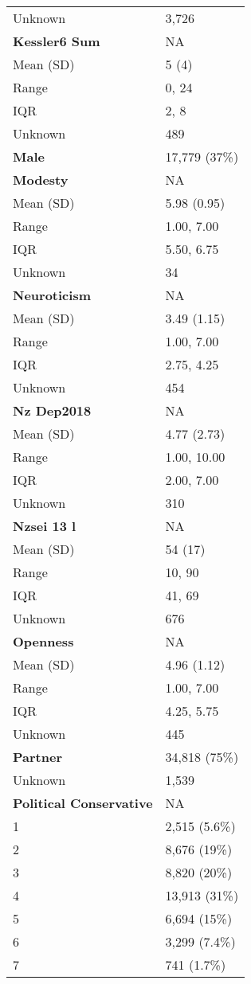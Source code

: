 \documentclass[
  singlecolumn]{article}
\begin{document}
\begin{longtable}[]{@{}ll@{}}
Unknown & 3,726 \\
\textbf{Kessler6 Sum} & NA \\
Mean (SD) & 5 (4) \\
Range & 0, 24 \\
IQR & 2, 8 \\
Unknown & 489 \\
\textbf{Male} & 17,779 (37\%) \\
\textbf{Modesty} & NA \\
Mean (SD) & 5.98 (0.95) \\
Range & 1.00, 7.00 \\
IQR & 5.50, 6.75 \\
Unknown & 34 \\
\textbf{Neuroticism} & NA \\
Mean (SD) & 3.49 (1.15) \\
Range & 1.00, 7.00 \\
IQR & 2.75, 4.25 \\
Unknown & 454 \\
\textbf{Nz Dep2018} & NA \\
Mean (SD) & 4.77 (2.73) \\
Range & 1.00, 10.00 \\
IQR & 2.00, 7.00 \\
Unknown & 310 \\
\textbf{Nzsei 13 l} & NA \\
Mean (SD) & 54 (17) \\
Range & 10, 90 \\
IQR & 41, 69 \\
Unknown & 676 \\
\textbf{Openness} & NA \\
Mean (SD) & 4.96 (1.12) \\
Range & 1.00, 7.00 \\
IQR & 4.25, 5.75 \\
Unknown & 445 \\
\textbf{Partner} & 34,818 (75\%) \\
Unknown & 1,539 \\
\textbf{Political Conservative} & NA \\
1 & 2,515 (5.6\%) \\
2 & 8,676 (19\%) \\
3 & 8,820 (20\%) \\
4 & 13,913 (31\%) \\
5 & 6,694 (15\%) \\
6 & 3,299 (7.4\%) \\
7 & 741 (1.7\%) \\

\end{longtable}
\end{document}
